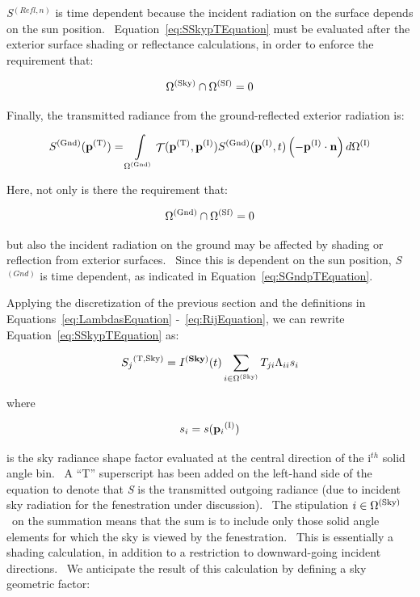\emph{S}\(^{(Refl,n)}\) is time dependent because the incident radiation on the surface depends on the sun position.~ Equation~\ref{eq:SSkypTEquation} must be evaluated after the exterior surface shading or reflectance calculations, in order to enforce the requirement that:

\begin{equation}
{\Omega ^{{\rm{(Sky)}}}} \cap {\Omega ^{{\rm{(Sf)}}}} = 0
\end{equation}

Finally, the transmitted radiance from the ground-reflected exterior radiation is:

\begin{equation}
{S^{{\rm{(Gnd)}}}}({{\bf{p}}^{{\rm{(T)}}}}) = \int\limits_{{\Omega ^{{\rm{(Gnd)}}}}} {{\mathop{\rm \mathcal{T}}\nolimits} ({{\bf{p}}^{{\rm{(T)}}}},{{\bf{p}}^{{\rm{(I)}}}}){S^{{\rm{(Gnd)}}}}({{\bf{p}}^{{\rm{(I)}}}},t)\left( { - {{\bf{p}}^{{\rm{(I)}}}}\cdot {\bf{n}}} \right)d{\Omega ^{{\rm{(I)}}}}}
\label{eq:SGndpTEquation}
\end{equation}

Here, not only is there the requirement that:

\begin{equation}
{\Omega ^{{\rm{(Gnd)}}}} \cap {\Omega ^{{\rm{(Sf)}}}} = 0
\end{equation}

but also the incident radiation on the ground may be affected by shading or reflection from exterior surfaces.~ Since this is dependent on the sun position, \emph{S}\(^{(Gnd)}\) is time dependent, as indicated in Equation~\ref{eq:SGndpTEquation}.

Applying the discretization of the previous section and the definitions in Equations~\ref{eq:LambdasEquation} -~\ref{eq:RijEquation}, we can rewrite Equation~\ref{eq:SSkypTEquation} as:

\begin{equation}
{S_j}^{{\rm{(T,Sky)}}} = {I^{({\bf{Sky}})}}(t)\sum\limits_{i \in {\Omega ^{{\rm{(Sky)}}}}} {{T_{ji}}{\Lambda_{ii}}{s_i}}
\end{equation}

where

\begin{equation}
{s_i} = s({{\bf{p}}_i}^{{\rm{(I)}}})
\end{equation}

is the sky radiance shape factor evaluated at the central direction of the i\(^{th}\) solid angle bin.~ A ``T'' superscript has been added on the left-hand side of the equation to denote that \emph{S} is the transmitted outgoing radiance (due to incident sky radiation for the fenestration under discussion).~ The stipulation \(i \in {\Omega ^{{\rm{(Sky)}}}}\) ~on the summation means that the sum is to include only those solid angle elements for which the sky is viewed by the fenestration.~ This is essentially a shading calculation, in addition to a restriction to downward-going incident directions.~ We anticipate the result of this calculation by defining a sky geometric factor:

